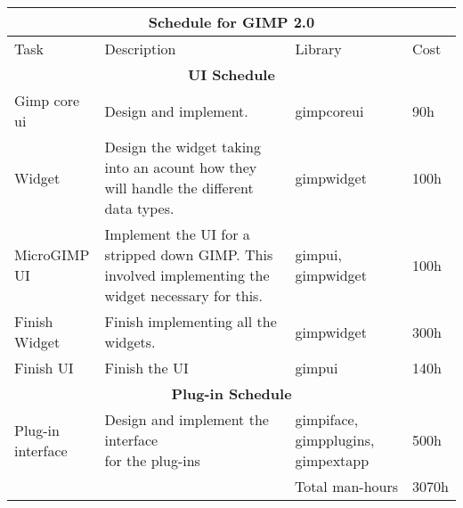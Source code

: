 \begin{flushleft}
\begin{tabular}{|p{2cm}|p{5cm}|p{2cm}|l|}\hline
\multicolumn{4}{|c|}{\rule[-3mm]{0mm}{8mm} \large \bf Schedule for GIMP 2.0}\\  
\hline
Task & Description & Library & Cost\\ 
\hline 

\multicolumn{4}{|c|}{\bf UI Schedule}\\
\hline 
Gimp core ui & Design and implement. & gimpcoreui & 90h\\
\hline
Widget & Design the widget taking into an acount how they will handle the different data types. & gimpwidget &100h\\
\hline
\raggedright{MicroGIMP\\ UI} & \raggedright{Implement the UI for a stripped down GIMP. This involved implementing the widget necessary for this.} & gimpui, gimpwidget & 100h\\
\hline
\raggedright{Finish\\ Widget} & \raggedright{Finish implementing all the \\ widgets.} & gimpwidget & 300h\\
\hline
Finish UI & Finish the UI & gimpui & 140h\\
\hline 

\multicolumn{4}{|c|}{\bf Plug-in Schedule}\\
\hline
\raggedright{Plug-in\\ interface} & \raggedright{Design and implement the interface\\ for the plug-ins} & gimpiface, gimpplugins, gimpextapp & 500h\\ 
\hline
 
\multicolumn{3}{|r|}{Total man-hours} & 3070h\\
\hline
\end{tabular}
\end{flushleft}

	

